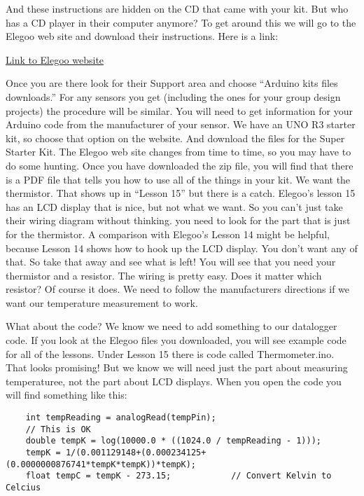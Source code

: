 And these instructions are hidden on the CD that came with your kit.  But who has a CD player in their computer anymore?  To get around this we will go to the Elegoo web site and download their instructions. Here is a link:

\begin{center}
 \href{https://www.elegoo.com/products/elegoo-uno-project-super-starter-kit}{Link to Elegoo website}
\end{center}
Once you are there look for their Support area and choose ``Arduino kits files downloads.'' For any sensors you get (including the ones for your group design projects) the procedure will be similar. You will need to get information for your Arduino code from the manufacturer of your sensor. We have an UNO R3 starter kit, so choose that option on the website.  And download the files for the Super Starter Kit.  The Elegoo web site changes from time to time, so you may have to do some hunting. Once you have downloaded the zip file, you will find that there is a PDF file that tells you how to use all of the things in your kit. We want the thermistor. That shows up in ``Lesson 15'' but there is a catch.  Elegoo's lesson 15 has an LCD display that is nice, but not what we want. So you can't just take their wiring diagram without thinking. you need to look for the part that is just for the thermistor.  A comparison with Elegoo's Lesson 14 might be helpful, because Lesson 14 shows how to hook up the LCD display.  You don't want any of that.  So take that away and see what is left!  You will see that you need your thermistor and a resistor. The wiring is pretty easy.  Does it matter which resistor?  Of course it does. We need to follow the manufacturers directions if we want our temperature measurement to work.  

What about the code?  We know we need to add something to our datalogger code.  If you look at the Elegoo files you downloaded, you will see example code for all of the lessons.  Under Lesson 15 there is code called Thermometer.ino.  That looks promising!  But we know we will need just the part about measuring temperaturee, not the part about LCD displays.  When you open the code you will find something like this:

\begin{small}
\begin{verbatim}
	int tempReading = analogRead(tempPin);
	// This is OK
	double tempK = log(10000.0 * ((1024.0 / tempReading - 1)));
	tempK = 1/(0.001129148+(0.000234125+(0.0000000876741*tempK*tempK))*tempK);
	float tempC = tempK - 273.15;            // Convert Kelvin to Celcius
\end{verbatim}
\end{small}

